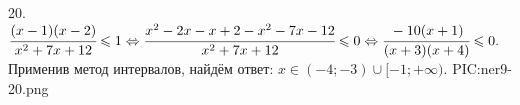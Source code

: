 20. $\cfrac{(x-1)(x-2)}{x^2+7x+12}\leqslant1\Leftrightarrow \cfrac{x^2-2x-x+2-x^2-7x-12}{x^2+7x+12}\leqslant0
\Leftrightarrow \cfrac{-10(x+1)}{(x+3)(x+4)}\leqslant0.$ Применив метод интервалов, найдём ответ: $x\in(-4;-3)\cup[-1;+\infty).$
{{PIC:ner9-20.png}}\\
